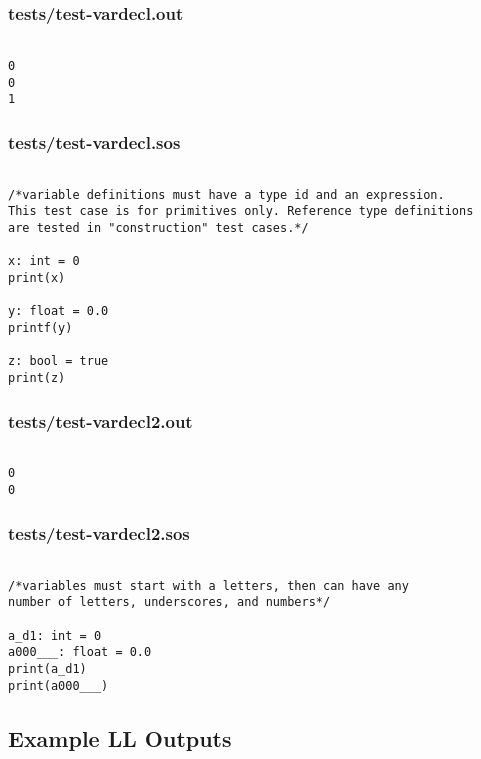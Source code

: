 \documentclass[main.tex]{subfiles}
\begin{document}
\subsubsection{tests/test-vardecl.out}

\begin{lstlisting}

0
0
1
\end{lstlisting}

\subsubsection{tests/test-vardecl.sos}

\begin{lstlisting}

/*variable definitions must have a type id and an expression.
This test case is for primitives only. Reference type definitions
are tested in "construction" test cases.*/

x: int = 0
print(x)

y: float = 0.0
printf(y)

z: bool = true
print(z)
\end{lstlisting}

\subsubsection{tests/test-vardecl2.out}

\begin{lstlisting}

0
0
\end{lstlisting}

\subsubsection{tests/test-vardecl2.sos}

\begin{lstlisting}

/*variables must start with a letters, then can have any
number of letters, underscores, and numbers*/

a_d1: int = 0
a000___: float = 0.0
print(a_d1)
print(a000___)
\end{lstlisting}

\subsection{Example LL Outputs}
\end{document}
